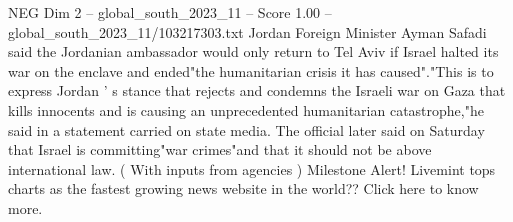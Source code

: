 \begin{textsample}{NEG Dim 2 – global\_south\_2023\_11 – Score 1.00 – global\_south\_2023\_11/103217303.txt}
Jordan Foreign Minister Ayman Safadi said the Jordanian ambassador would only return to Tel Aviv if Israel halted its war on the enclave and ended"the humanitarian crisis it has caused"."This is to express Jordan ' s stance that rejects and condemns the Israeli war on Gaza that kills innocents and is causing an unprecedented humanitarian catastrophe,"he said in a statement carried on state media.
The official later said on Saturday that Israel is committing"war crimes"and that it should not be above international law. ( With inputs from agencies ) Milestone Alert!
Livemint tops charts as the fastest growing news website in the world??
Click here to know more.

\end{textsample}
